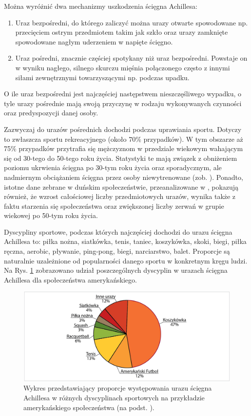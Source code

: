 Można wyróżnić dwa mechanizmy uszkodzenia ścięgna Achillesa: 
\begin{enumerate}
	\item Uraz bezpośredni, do którego zaliczyć można urazy otwarte spowodowane np. przecięciem ostrym przedmiotem takim jak szkło oraz urazy zamknięte spowodowane nagłym uderzeniem w napięte ścięgno.
	\item Uraz pośredni, znacznie częściej spotykany niż uraz bezpośredni. Powstaje \linebreak on w wyniku nagłego, silnego skurczu mięśnia połączonego często z innymi siłami zewnętrznymi towarzyszącymi np. podczas upadku.
\end{enumerate}
O ile uraz bezpośredni jest najczęściej następstwem nieszczęśliwego wypadku, o tyle urazy pośrednie mają swoją przyczynę w rodzaju wykonywanych czynności oraz predyspozycji danej osoby. 

Zazwyczaj do urazów pośrednich dochodzi podczas uprawiania sportu. Dotyczy to zwłaszcza sportu rekreacyjnego (około 70\% przypadków). W tym obszarze \linebreak aż 75\% przypadków przytrafia się mężczyznom w przedziale wiekowym wahającym się od 30-tego do 50-tego roku życia. Statystyki te mają związek z obniżeniem poziomu ukrwienia ścięgna po 30-tym roku życia oraz sporadycznym, ale nadmiernym obciążaniem ścięgna przez osoby niewytrenowane (zob. \cite{Etiologia}). Ponadto, istotne dane zebrane w duńskim społeczeństwie, przeanalizowane w \cite{Ganestam2015}, pokazują również, że wzrost całościowej liczby przedmiotowych urazów, wynika także z faktu starzenia się społeczeństwa oraz zwiększonej liczby zerwań w grupie wiekowej po 50-tym roku życia. 

Dyscypliny sportowe, podczas których najczęściej dochodzi do urazu ścięgna Achillesa to: piłka nożna, siatkówka, tenis, taniec, koszykówka, skoki, biegi, piłka ręczna, aerobic, pływanie, ping-pong, biegi, narciarstwo, balet. Proporcje są naturalnie uzależnione od popularności danego sportu w konkretnym kręgu ludzi. \linebreak Na Rys. \ref{rupture} zobrazowano udział poszczególnych dyscyplin w urazach ścięgna Achillesa dla społeczeństwa amerykańskiego. 
\begin{figure}[h!]
	\centering
	\includegraphics[width=1\textwidth]{figures/Achilles_zerwanie.png}
	\caption{Wykres przedstawiający proporcje występowania urazu ścięgna Achillesa w różnych dyscyplinach sportowych na przykładzie amerykańskiego społeczeństwa (na podst. \cite{EpidemiologyUS}).}
	\label{rupture}
\end{figure}

